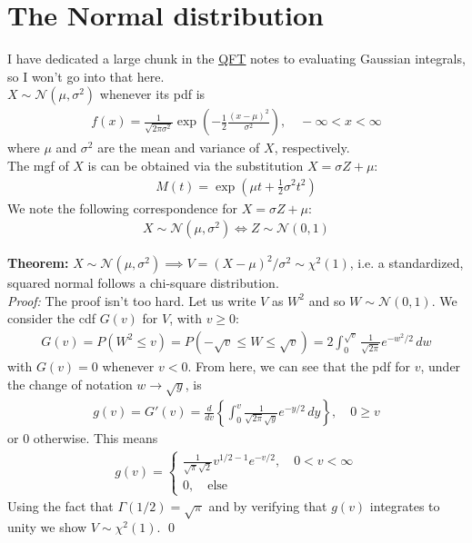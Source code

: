 \documentclass{book}
\theoremstyle{definition}
\newcommand{\f}[2]{\frac{#1}{#2}}
\newcommand{\lp}{\left(}
\newcommand{\rp}{\right)}
\newcommand{\lc}{\left\{}
\newcommand{\rc}{\right\}}
\begin{document}
\section{The Normal distribution}

I have dedicated a large chunk in the \href{https://huanqbui.com/LaTeX projects/HuanBui_QM/HuanBui_QM.pdf}{\underline{QFT}} notes to evaluating Gaussian integrals, so I won't go into that here. \\

$X \sim \mathcal{N}(\mu,\sigma^2)$ whenever its pdf is
\begin{align}
\boxed{f(x) = \f{1}{\sqrt{2\pi \sigma^2}} \exp\lp -\f{1}{2}\f{(x-\mu)^2}{\sigma^2} \rp, \quad -\infty < x < \infty}
\end{align}
where $\mu$ and $\sigma^2$ are the mean and variance of $X$, respectively. \\

The mgf of $X$ is can be obtained via the substitution $X = \sigma Z + \mu$:
\begin{align}
\boxed{M(t) = \exp\lp \mu t  + \f{1}{2}\sigma^2 t^2 \rp}
\end{align}
We note the following correspondence for $X = \sigma Z + \mu$:
\begin{align}
X \sim \mathcal{N}(\mu,\sigma^2) \iff {Z \sim \mathcal{N}(0,1)}
\end{align}

\noindent\textbf{Theorem:} $X \sim \mathcal{N}(\mu, \sigma^2) \implies V = (X-\mu)^2/\sigma^2 \sim \chi^2(1)$, i.e. a standardized, squared normal follows a chi-square distribution. \\

\noindent \textit{Proof:} The proof isn't too hard. Let us write $V$ as $W^2$ and so $W \sim \mathcal{N}(0,1)$.  We consider the cdf $G(v)$ for $V$, with $v \geq 0$:
\begin{align}
G(v) = P( W^2 \leq v) = P( -\sqrt{v} \leq  W  \leq \sqrt{v} ) = 2\int^{\sqrt{v}}_0 \f{1}{ \sqrt{2\pi} } e^{-w^2/2}\,dw
\end{align}
with $G(v) = 0$ whenever $v<0$. From here, we can see that the pdf for $v$, under the change of notation $w \to \sqrt{y}$, is
\begin{align}
g(v) = G'(v) = \f{d}{dv}\lc \int^v_0 \f{1}{\sqrt{2\pi}\sqrt{y}}e^{-y/2}\,dy \rc, \quad 0 \geq v
\end{align}
or $0$ otherwise. This means
\begin{align}
\boxed{g(v) = \begin{cases}
\f{1}{\sqrt{\pi}\sqrt{2}} v^{1/2-1}e^{-v/2}, \quad 0 < v< \infty\\
0, \quad \text{else}
\end{cases}}
\end{align}
Using the fact that $\Gamma(1/2) = \sqrt{\pi}$ and by verifying that $g(v)$ integrates to unity we show $V \sim \chi^2(1)$. \qed\\
\end{document}

